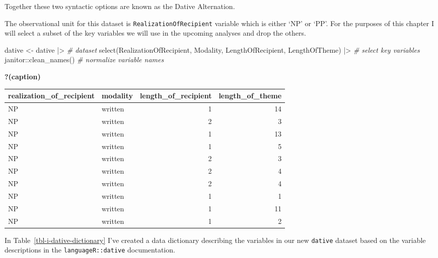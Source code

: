 \documentclass[
  letterpaper,
]{scrbook}
\newenvironment{Shaded}{\begin{snugshade}}{\end{snugshade}}
\newcommand{\CommentTok}[1]{\textcolor[rgb]{0.00,0.00,0.00}{\textit{#1}}}
\newcommand{\FunctionTok}[1]{\textcolor[rgb]{0.00,0.00,0.00}{#1}}
\newcommand{\NormalTok}[1]{\textcolor[rgb]{0.00,0.00,0.00}{#1}}
\newcommand{\OtherTok}[1]{\textcolor[rgb]{0.00,0.00,0.00}{#1}}
\newcommand{\SpecialCharTok}[1]{\textcolor[rgb]{0.00,0.00,0.00}{#1}}
\begin{document}
Together these two syntactic options are known as the Dative
Alternation.

The observational unit for this dataset is
\texttt{RealizationOfRecipient} variable which is either `NP' or `PP'.
For the purposes of this chapter I will select a subset of the key
variables we will use in the upcoming analyses and drop the others.

\begin{Shaded}
\begin{Highlighting}[]
\NormalTok{dative }\OtherTok{\textless{}{-}} 
\NormalTok{  dative }\SpecialCharTok{|\textgreater{}} \CommentTok{\# dataset}
  \FunctionTok{select}\NormalTok{(RealizationOfRecipient, Modality, LengthOfRecipient, LengthOfTheme) }\SpecialCharTok{|\textgreater{}} \CommentTok{\# select key variables}
\NormalTok{  janitor}\SpecialCharTok{::}\FunctionTok{clean\_names}\NormalTok{() }\CommentTok{\# normalize variable names}
\end{Highlighting}
\end{Shaded}

\begin{table}

\caption{\textbf{?(caption)}}

\end{table}

\begin{tabular}{llrr}
\toprule
realization\_of\_recipient & modality & length\_of\_recipient & length\_of\_theme\\
\midrule
NP & written & 1 & 14\\
NP & written & 2 & 3\\
NP & written & 1 & 13\\
NP & written & 1 & 5\\
NP & written & 2 & 3\\
\addlinespace
NP & written & 2 & 4\\
NP & written & 2 & 4\\
NP & written & 1 & 1\\
NP & written & 1 & 11\\
NP & written & 1 & 2\\
\bottomrule
\end{tabular}

In Table~\ref{tbl-i-dative-dictionary} I've created a data dictionary
describing the variables in our new \texttt{dative} dataset based on the
variable descriptions in the \texttt{languageR::dative} documentation.
\end{document}
